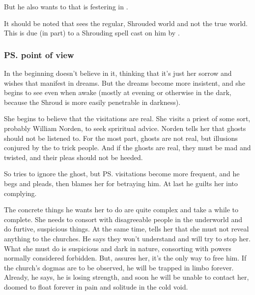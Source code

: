 
But he also wants to  that is festering in \Malcur. 

It should be noted that \Icor{} sees the regular, Shrouded world and not the true world. 
This is due (in part) to a Shrouding spell cast on him by \LocarPsyrex. 





\subsubsection{\ps{\Tiroco} point of view}
In the beginning \Tiroco{} doesn't believe in it, thinking that it's just her sorrow and wishes that manifest in dreams. But the dreams become more insistent, and she begins to see \Icor{} even when awake (mostly at evening or otherwise in the dark, because the Shroud is more easily penetrable in darkness). 

She begins to believe that the visitations are real. She visits a priest of some sort, probably William Norden, to seek spriritual advice. Norden tells her that ghosts should not be listened to. For the most part, ghosts are not real, but illusions conjured by the \Qliphoth{} to trick people. And if the ghosts are real, they must be mad and twisted, and their pleas should not be heeded.

So \Tiroco{} tries to ignore the ghost, but \ps{\Icor} visitations become more frequent, and he begs and pleads, then blames her for betraying him. At last he guilts her into complying. 

The concrete things he wants her to do are quite complex and take a while to complete. She needs to consort with disagreeable people in the \Malcurian underworld and do furtive, suspicious things. At the same time, \Icor{} tells her that she must not reveal anything to the churches. He says they won't understand and will try to stop her. What she must do is suspicious and dark in nature, consorting with powers normally considered forbidden. But, \Icor{} assures her, it's the only way to free him. If the church's dogmas are to be observed, he will be trapped in limbo forever. Already, he says, he is losing strength, and soon he will be unable to contact her, doomed to float forever in pain and solitude in the cold void. 

